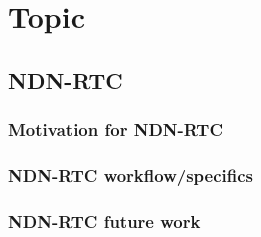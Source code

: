 \chapter{Topic} \label{chapter:Topic}


\section{NDN-RTC}


\subsection{Motivation for NDN-RTC}


\subsection{NDN-RTC workflow/specifics}


\subsection{NDN-RTC future work}


